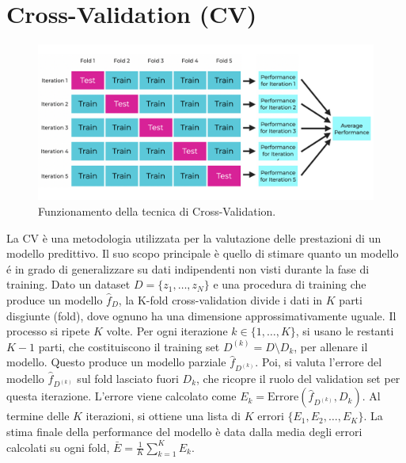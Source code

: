 \documentclass[a4paper,12pt]{report}
\begin{document}
	\section{Cross-Validation (CV)}
	\begin{figure}[H]
		\centering
		\includegraphics[width=1.0\textwidth]{img/cv.png}
		\caption{Funzionamento della tecnica di Cross-Validation.}
	\end{figure}
	La CV è una metodologia utilizzata per la valutazione delle prestazioni di un modello predittivo. Il suo scopo principale è quello di stimare quanto un modello é in grado di generalizzare su dati indipendenti non visti durante la fase di training. Dato un dataset $D = \{z_1, \dots, z_N\}$ e una procedura di training che produce un modello $\hat f_{D}$, la K-fold cross-validation divide i dati in $K$ parti disgiunte (fold), dove ognuno ha una dimensione approssimativamente uguale. Il processo si ripete $K$ volte. Per ogni iterazione $k \in \{1, \dots, K\}$, si usano le restanti $K-1$ parti, che costituiscono il training set $D^{(k)} = D \setminus D_k$, per allenare il modello. Questo produce un modello parziale $\hat f_{D^{(k)}}$. Poi, si valuta l'errore del modello $\hat f_{D^{(k)}}$ sul fold lasciato fuori $D_k$, che ricopre il ruolo del validation set per questa iterazione. L'errore viene calcolato come $E_k = \text{Errore}(\hat f_{D^{(k)}}, D_k)$. Al termine delle $K$ iterazioni, si ottiene una lista di $K$ errori $\{E_1, E_2, \dots, E_K\}$. La stima finale della performance del modello è data dalla media degli errori calcolati su ogni fold, $\bar{E} = \frac{1}{K} \sum_{k=1}^K E_k$.
	
\end{document}
